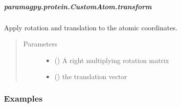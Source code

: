 \documentclass[a4paper,10pt,english]{sphinxmanual}
\begin{document}
\begin{fulllineitems}
\begin{fulllineitems}
\begin{fulllineitems}
\label{\detokenize{reference/generated/paramagpy.protein.CustomAtom.top:paramagpy.protein.CustomAtom.top}}
\end{fulllineitems}



\subparagraph{paramagpy.protein.CustomAtom.transform}
\label{\detokenize{reference/generated/paramagpy.protein.CustomAtom.transform:paramagpy-protein-customatom-transform}}\label{\detokenize{reference/generated/paramagpy.protein.CustomAtom.transform::doc}}

\begin{fulllineitems}
\label{\detokenize{reference/generated/paramagpy.protein.CustomAtom.transform:paramagpy.protein.CustomAtom.transform}}
Apply rotation and translation to the atomic coordinates.
\begin{quote}\begin{description}
\item[{Parameters}] \leavevmode\begin{itemize}
\item {} 
 () \textendash{} A right multiplying rotation matrix

\item {} 
 () \textendash{} the translation vector

\end{itemize}

\end{description}\end{quote}
\subsubsection*{Examples}

%
\begin{sphinxVerbatim}[commandchars=\\\{\}]
   
   
 
\end{sphinxVerbatim}


\end{fulllineitems}
\end{fulllineitems}
\end{fulllineitems}
\end{document}
